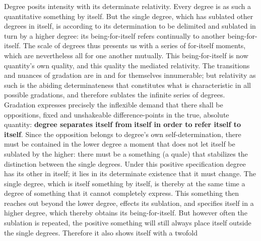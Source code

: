 \documentclass[12pt,a4paper,openany]{book}
\newcommand{\opage}[1]{\marginnote{\footnotesize\textit{[#1]}}}
\begin{document}
\opage{46}Degree posits intensity with its determinate relativity. Every degree is as such a quantitative something by itself. But the single degree, which has sublated other degrees in itself, is according to its determination to be delimited and sublated in turn by a higher degree: its being-for-itself refers continually to another being-for-itself. The scale of degrees thus presents us with a series of for-itself moments, which are nevertheless all for one another mutually. This being-for-itself is now quantity's own quality, and this quality the mediated relativity. The transitions and nuances of gradation are in and for themselves innumerable; but relativity as such is the abiding determinateness that constitutes what is characteristic in all possible gradations, and therefore sublates the infinite series of degrees. Gradation expresses precisely the inflexible demand that there shall be oppositions, fixed and unshakeable difference-points in the true, absolute quantity: \textbf{degree separates itself from} \textbf{itself in order to} \textbf{refer itself to} \textbf{itself}. Since the opposition belongs to degree's own self-determination, there must be contained in the lower degree a moment that does not let itself be sublated by the higher: there must be a something (a quale) that stabilizes the distinction between the single degrees. Under this positive specification degree has its other in itself; it lies in its determinate existence that it must change. The single degree, which is itself something by itself, is thereby at the same time a degree of something that it cannot completely express. This something then reaches out beyond the lower degree, effects its sublation, and specifies itself in a higher degree, which thereby obtains its being-for-itself. But however often the sublation is repeated, the positive something will still always place itself outside the single degrees. Therefore it also shows itself with a twofold
\setcounter{footnote}{0}%
\end{document}
